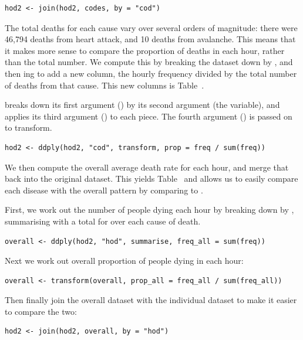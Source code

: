 \documentclass[article]{jss}
\begin{document}
\begin{Verbatim}
hod2 <- join(hod2, codes, by = "cod")
\end{Verbatim}

The total deaths for each cause vary over several orders of magnitude: there were 46,794 deaths from heart attack, and 10 deaths from avalanche. This means that it makes more sense to compare the proportion of deaths in each hour, rather than the total number. We compute this by breaking the dataset down by , and then ing to add a new  column, the hourly frequency divided by the total number of deaths from that cause. This new columns is Table~.

 breaks down its first argument () by its second argument (the  variable), and applies its third argument () to each piece. The fourth argument () is passed on to transform.

\begin{Verbatim}
hod2 <- ddply(hod2, "cod", transform, prop = freq / sum(freq))
\end{Verbatim}

We then compute the overall average death rate for each hour, and merge that back into the original dataset. This yields Table~ and allows us to easily compare each disease with the overall pattern by comparing  to .


First, we work out the number of people dying each hour by breaking down  by , summarising with a total for over each cause of death.

\begin{Verbatim}
overall <- ddply(hod2, "hod", summarise, freq_all = sum(freq))
\end{Verbatim}

Next we work out overall proportion of people dying in each hour:

\begin{Verbatim}
overall <- transform(overall, prop_all = freq_all / sum(freq_all))
\end{Verbatim}

Then finally join the overall dataset with the individual dataset to make it easier to compare the two:

\begin{Verbatim}
hod2 <- join(hod2, overall, by = "hod")
\end{Verbatim}
\end{document}
